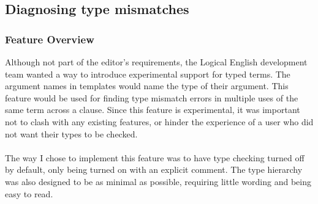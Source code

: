 \documentclass[../main.tex]{subfiles}
\begin{document}
\subsection{Diagnosing type mismatches}
\subsubsection{Feature Overview}
Although not part of the editor's requirements, the Logical English development team wanted a way to introduce experimental support for typed terms. The argument names in templates would name the type of their argument. This feature would be used for finding type mismatch errors in multiple uses of the same term across a clause. Since this feature is experimental, it was important not to clash with any existing features, or hinder the experience of a user who did not want their types to be checked.
\\
\\
The way I chose to implement this feature was to have type checking turned off by default, only being turned on with an explicit  comment. The type hierarchy was also designed to be as minimal as possible, requiring little wording and being easy to read. 
\end{document}
